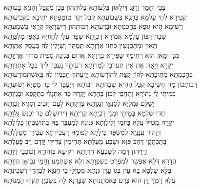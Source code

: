 \begin{footnotesize}
\kahal
צְבִי וְחַמֵּד וְרַגֵּג דְּיִלְאוּן בְּלָעוּתָא צְלוֹתְהוֹן בְּכֵן מְקַבֵּל וְהַנְיָא בָעוּתָא׃\\
\shatz
קְטִירָא לְחֵי עָלְמָא בְּתָגָא בִּשְׁבוּעֲתָא קֳבֵל יְקַר טוֹטַפְתָּא יְתִיבָא בִקְבִיעוּתָא׃\\
\kahal
רְשִׁימָא הִיא גוּפָא בְּחׇכְמְתָא וּבְדַעְתָּא רְבוּתְהוֹן דְּיִשְׂרָאֵל קְרָאֵי בִשְׁמַעְתָּא׃\\
\shatz
שְׁבַח רִבּוֹן עָלְמָא אֲמִירָא דַכְוָתָא שְׁפַר עֲלַי לְחַוּוֹיֵהּ בְּאַפֵּי מַלְכְּוָתָא׃\\
\kahal
תָּאִין וּמִתְכַּנְּשִׁין כְּחֵזוּ אִדְוָתָא תְּמֵהִין וְשָׁיְלִין לֵהּ בְּעֵסֶק אַתְוָתָא׃\\
\shatz
מְנָן וּמָאן הוּא רְחִימָךְ שַׁפִּירָא בְרֵוָתָא אֲרוּם בְּגִינֵהּ סָפִית מְדוֹר אַרְיָוָתָא׃\\
\kahal
יְקָרָא וְיָאָה אַתְּ אִין תְּעֹרְבִי לְמַרְוָתָא רְעוּתֵךְ נַעְבֵּד לִיךְ בְּכׇל אַתְרְוָתָא׃\\
\shatz
בְּחׇכְמְתָא מְתִיבָתָא לְהוֹן קְצָת לְהוֹדָעוּתָא יְדַעְתּוּן חַכְּמִין לֵהּ בְּאִשְׁתְּמוֹדָעוּתָא׃\\
\kahal
רְבוּתְכוֹן מָה חֲשִׁיבָא קֳבֵל הַהִיא שְׁבַחְתָּא רְבוּתָא דְּיַעְבֵּד לִי כַּד מַטְיָא יְשׁוּעֲתָא׃\\
\shatz
בְּמֵיתֵי לִי נְהוֹרָא וְתַחֲפֵי לְכוֹן בַּהֲתָא יְקָרֵהּ כַּד אִתְגְּלִי בְּתֻקְפָא וּבְגֵיוָתָא׃\\
\kahal
יְשַׁלֵּם גְּמֻלַּיָּא לְסַנְאֵי וְנַגְוָתָא צִדְקָתָא לְעַם חֲבִיב וְסַגִּיא זַכְוָתָא׃\\
\shatz
חֲדוּ שְׁלֵמָא בְּמֵיתֵי וּמָנֵי דַכְיָתָא קִרְיְתָא דִירוּשְׁלֵם כַּד יְכַנֵּשׁ גַּלְוָתָא׃\\
\kahal
יְקָרֵהּ מַטִּיל עֲלַהּ בְּיוֹמֵי וְלֵילְוָתָא גְּנוּנֵהּ לְמֶעְבַּד בַּהּ בְּתוּשְׁבְּחָן כְּלִילָתָא׃\\
\shatz
דְּזֵהוֹר עֲנָנַיָּא לְמִשְׁפַּר כִּילָתָא לְפוּמֵהּ דַּעֲבִידְתָּא עֲבִידָן מְטַלַּלְתָּא׃\\
\kahal
בְּתַכְתְּקֵי דְּהַב פִּזָּא וּשְׁבַע מַעֲלָתָא תְּחִימִין צַדִּיקֵי קֳדָם רַב פׇּעֳלָתָא׃\\
\shatz
וְרֵוֵיהוֹן דָּמֵה לְשַׁבְעָא חֶדְוָתָא רְקִיעָא בְּזֵהוֹרֵהּ וְכוֹכְבֵי זִיוָתָא׃\\
\kahal
הֲדָרָא דְּלָא אֶפְשַׁר לְמִפְרַט בְּשִׂפְוָתָא וְלָא אִשְׁתְּמַע וְחָמֵי נְבִיאָן חֶזְוָתָא׃\\
\shatz
בְּלָא שָׁלְטָא בֵהּ עֵין בְּגוֹ עֵדֶן גִּנְתָא מְטַיְלֵי בֵי חִנְגָּא לְבַהֲדֵי דִשְׁכִינְתָּא׃\\
\kahal
עֲלֵהּ רָמְזֵי דֵּן הוּא בְּרַם בְּאֶמְתָּנוּתָא שַׂבַּרְנָא לֵהּ בְּשִׁבְיָן תְּקוֹף הֵמְנוּתָא׃\\

\end{footnotesize}
